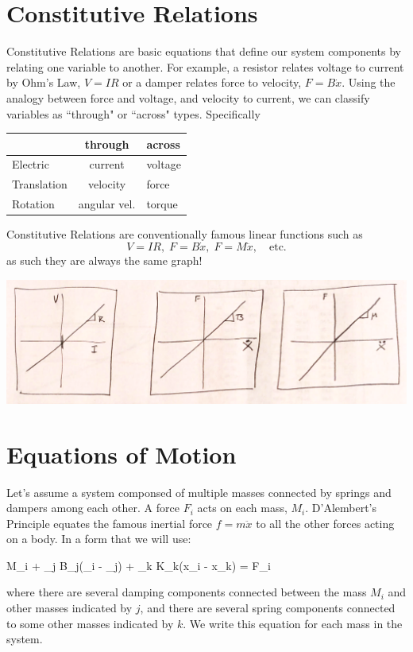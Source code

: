 \section{Constitutive Relations}
Constitutive Relations are basic equations that define our system components by relating one variable to another.  For example,
a resistor relates voltage to current by Ohm's Law, $V=IR$ or a damper relates force to velocity, $F=B\dot{x}$.   Using the
analogy between force and voltage, and velocity to current, we can classify variables as ``through" or ``across" types.  Specifically

\vspace{0.25in}
\begin{tabular}{l|c|l}
           & through & across\\ \hline
Electric   & current  & voltage \\
Translation & velocity & force \\
Rotation   & angular vel.  & torque
\end{tabular}

Constitutive Relations are conventionally famous linear  functions such as
 \[
 V=IR, \; F= B\dot{x},\; F=M\ddot{x}, \quad \mathrm{etc.}
 \]
as such they are always the same graph!

\includegraphics[width=150mm]{figs02/Q68B24.png}



\section{Equations of Motion}

Let's assume a system componsed of multiple masses connected by springs and dampers among each other.   A force $F_i$ acts on each mass, $M_i$.   D'Alembert's Principle equates the famous inertial force $f=m\ddot{x}$ to all the other forces acting on a body.   In a form that we will use:

\bq\label{D'Alembert}
M_i  + \sum_j B_j(_i - _j) + \sum_k K_k(x_i - x_k) = F_i
\eq

where there are several damping components connected between the mass $M_i$ and other masses indicated by $j$, and there are several
spring components connected to some other masses indicated by $k$.  We write this equation for each mass in the system.

